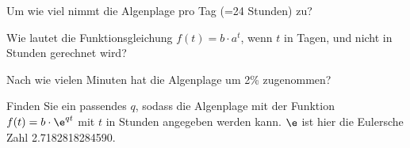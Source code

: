 \begin{bbwAufgabenBlock}

\item Um wie viel nimmt die Algenplage pro Tag (=24 Stunden) zu?



\item Wie lautet die Funktionsgleichung $f(t)=b\cdot{}a^t$, wenn $t$ in Tagen, und nicht in Stunden gerechnet wird?


\item Nach wie vielen Minuten hat die Algenplage um 2\% zugenommen?


\item Finden Sie ein passendes $q$, sodass die Algenplage mit der Funktion $f(t) = b\cdot{}\e^{qt}$ mit $t$ in Stunden angegeben werden kann. $\e$ ist hier die Eulersche Zahl 2.7182818284590.



\end{bbwAufgabenBlock}


\platzFuerBerechnungenBisEndeSeite{}


\newpage
